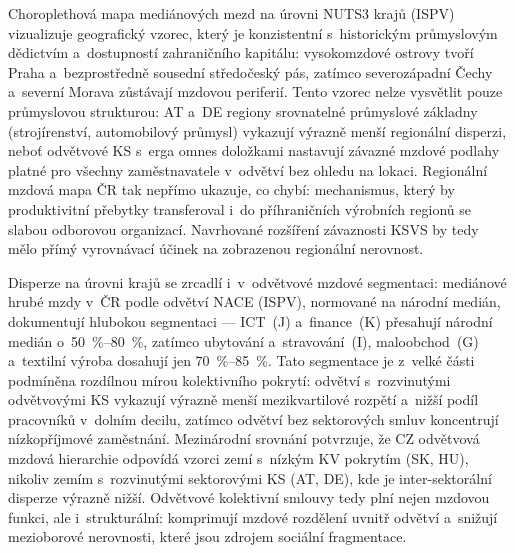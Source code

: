 Choroplethová mapa mediánových mezd na úrovni NUTS3 krajů (\ac{ISPV}) vizualizuje geografický vzorec, který je konzistentní s~historickým průmyslovým dědictvím a~dostupností zahraničního kapitálu: vysokomzdové ostrovy tvoří Praha a~bezprostředně sousední středočeský pás, zatímco severozápadní Čechy a~severní Morava zůstávají mzdovou periferií.
Tento vzorec nelze vysvětlit pouze průmyslovou strukturou: AT a~DE regiony srovnatelné průmyslové základny (strojírenství, automobilový průmysl) vykazují výrazně menší regionální disperzi, neboť odvětvové \ac{KS} s~erga omnes doložkami nastavují závazné mzdové podlahy platné pro všechny zaměstnavatele v~odvětví bez ohledu na lokaci.
Regionální mzdová mapa ČR tak nepřímo ukazuje, co chybí: mechanismus, který by produktivitní přebytky transferoval i~do příhraničních výrobních regionů se slabou odborovou organizací.
Navrhované rozšíření závaznosti \ac{KSVS} by tedy mělo přímý vyrovnávací účinek na zobrazenou regionální nerovnost.



Disperze na úrovni krajů se zrcadlí i~v~odvětvové mzdové segmentaci: mediánové hrubé mzdy v~ČR podle odvětví \ac{NACE} (\ac{ISPV}), normované na národní medián, dokumentují hlubokou segmentaci --- ICT~(J) a~finance~(K) přesahují národní medián o~\SIrange{50}{80}{\percent}, zatímco ubytování a~stravování~(I), maloobchod~(G) a~textilní výroba dosahují jen \SIrange{70}{85}{\percent}.
Tato segmentace je z~velké části podmíněna rozdílnou mírou kolektivního pokrytí: odvětví s~rozvinutými odvětvovými \ac{KS} vykazují výrazně menší mezikvartilové rozpětí a~nižší podíl pracovníků v~dolním decilu, zatímco odvětví bez sektorových smluv koncentrují nízkopříjmové zaměstnání.
Mezinárodní srovnání potvrzuje, že CZ odvětvová mzdová hierarchie odpovídá vzorci zemí s~nízkým \ac{KV} pokrytím (SK, HU), nikoliv zemím s~rozvinutými sektorovými \ac{KS} (AT, DE), kde je inter-sektorální disperze výrazně nižší.
Odvětvové kolektivní smlouvy tedy plní nejen mzdovou funkci, ale i~strukturální: komprimují mzdové rozdělení uvnitř odvětví a~snižují mezioborové nerovnosti, které jsou zdrojem sociální fragmentace.
